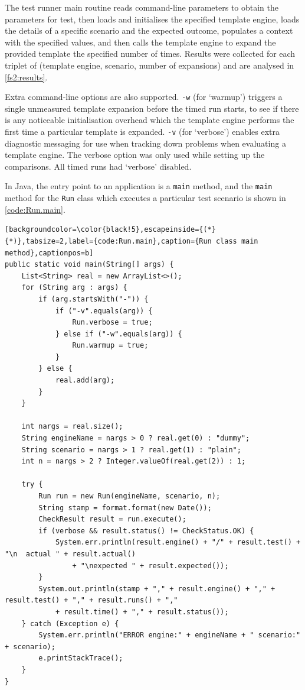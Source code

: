 The test runner main routine reads command-line parameters to obtain the parameters for test, then loads and initialises the specified template engine, loads the details of a specific scenario and the expected outcome, populates a context with the specified values, and then calls the template engine to expand the provided template the specified number of times. Results were collected for each triplet of (template engine, scenario, number of expansions) and are analysed in \autoref{fs2:results}.

Extra command-line options are also supported. \verb!-w! (for `warmup') triggers a single unmeasured template expansion before the timed run starts, to see if there is any noticeable initialisation overhead which the template engine performs the first time a particular template is expanded. \verb!-v! (for `verbose') enables extra diagnostic messaging for use when tracking down problems when evaluating a template engine. The verbose option was only used while setting up the comparisons. All timed runs had `verbose' disabled.

In Java, the entry point to an application is a \verb!main! method, and the \verb!main! method for the \verb!Run! class which executes a particular test scenario is shown in \autoref{code:Run.main}.

\begin{lstlisting}[backgroundcolor=\color{black!5},escapeinside={(*}{*)},tabsize=2,label={code:Run.main},caption={Run class main method},captionpos=b]
public static void main(String[] args) {
    List<String> real = new ArrayList<>();
    for (String arg : args) {
        if (arg.startsWith("-")) {
            if ("-v".equals(arg)) {
                Run.verbose = true;
            } else if ("-w".equals(arg)) {
                Run.warmup = true;
            }
        } else {
            real.add(arg);
        }
    }

    int nargs = real.size();
    String engineName = nargs > 0 ? real.get(0) : "dummy";
    String scenario = nargs > 1 ? real.get(1) : "plain";
    int n = nargs > 2 ? Integer.valueOf(real.get(2)) : 1;

    try {
        Run run = new Run(engineName, scenario, n);
        String stamp = format.format(new Date());
        CheckResult result = run.execute();
        if (verbose && result.status() != CheckStatus.OK) {
            System.err.println(result.engine() + "/" + result.test() + "\n  actual " + result.actual()
                + "\nexpected " + result.expected());
        }
        System.out.println(stamp + "," + result.engine() + "," + result.test() + "," + result.runs() + ","
            + result.time() + "," + result.status());
    } catch (Exception e) {
        System.err.println("ERROR engine:" + engineName + " scenario:" + scenario);
        e.printStackTrace();
    }
}
\end{lstlisting}

